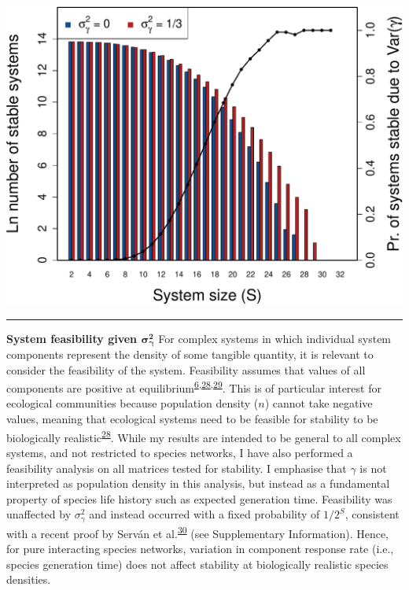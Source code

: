 \documentclass[]{article}
\begin{document}
\includegraphics{fig4.pdf}

\vspace{2mm}
\hrule


\textbf{System feasibility given \(\mathbf{\sigma^{2}_{\gamma}}\)} For
complex systems in which individual system components represent the
density of some tangible quantity, it is relevant to consider the
feasibility of the system. Feasibility assumes that values of all
components are positive at
equilibrium\textsuperscript{\protect\hyperlink{ref-Grilli2017}{6},\protect\hyperlink{ref-Dougoud2018}{28},\protect\hyperlink{ref-Song2018}{29}}.
This is of particular interest for ecological communities because
population density (\(n\)) cannot take negative values, meaning that
ecological systems need to be feasible for stability to be biologically
realistic\textsuperscript{\protect\hyperlink{ref-Dougoud2018}{28}}.
While my results are intended to be general to all complex systems, and
not restricted to species networks, I have also performed a feasibility
analysis on all matrices tested for stability. I emphasise that
\(\gamma\) is not interpreted as population density in this analysis,
but instead as a fundamental property of species life history such as
expected generation time. Feasibility was unaffected by
\(\sigma^{2}_{\gamma}\) and instead occurred with a fixed probability of
\(1/2^{S}\), consistent with a recent proof by Serván et
al.\textsuperscript{\protect\hyperlink{ref-Servan2018}{30}} (see
Supplementary Information). Hence, for pure interacting species
networks, variation in component response rate (i.e., species generation
time) does not affect stability at biologically realistic species
densities.
\end{document}
